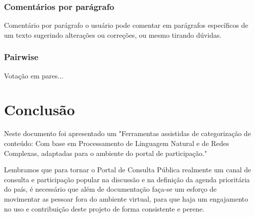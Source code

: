 \documentclass[12pt]{article}
\newcommand{\ProductDescription}{"Ferramentas assistidas de categorização de conteúdo: Com base em Processamento de Linguagem Natural e de Redes Complexas, adaptadas para o ambiente do portal de participação."
}
\begin{document}
\subsubsection{Comentários por parágrafo}

Comentário por parágrafo o usuário pode comentar em parágrafos específicos de
um texto sugerindo alterações ou correções, ou mesmo tirando dúvidas.

\subsubsection{Pairwise}

Votação em pares...

\section{Conclusão}

Neste documento foi apresentado um \ProductDescription

Lembramos que para tornar o Portal de Consulta Pública realmente um canal de
consulta e participação popular na discussão e na definição da agenda
prioritária do país, é necessário que além de documentação faça-se um esforço
de movimentar as pessoar fora do ambiente virtual, para que haja um
engajamento no uso e contribuição deste projeto de forma consistente e perene.

\newpage

\newpage
\listoffigures
\newpage
\printindex
\newpage

%
\end{document}
